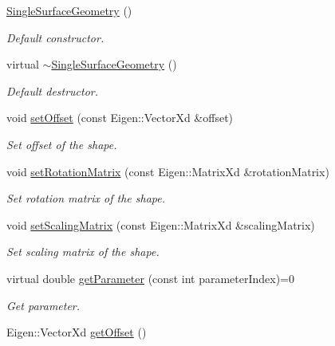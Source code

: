 \begin{DoxyCompactItemize}
\item 
\hyperlink{classtudat_1_1geometric__shapes_1_1SingleSurfaceGeometry_a84a7a555f2d51bbf05417aa696e18a20}{Single\+Surface\+Geometry} ()
\begin{DoxyCompactList}\small\item\em Default constructor. \end{DoxyCompactList}\item 
virtual \hyperlink{classtudat_1_1geometric__shapes_1_1SingleSurfaceGeometry_ac276f4deb7405652e3e0521218910996}{$\sim$\+Single\+Surface\+Geometry} ()
\begin{DoxyCompactList}\small\item\em Default destructor. \end{DoxyCompactList}\item 
void \hyperlink{classtudat_1_1geometric__shapes_1_1SingleSurfaceGeometry_a97575d937668eb0079cce753ce08fabf}{set\+Offset} (const Eigen\+::\+Vector\+Xd \&offset)
\begin{DoxyCompactList}\small\item\em Set offset of the shape. \end{DoxyCompactList}\item 
void \hyperlink{classtudat_1_1geometric__shapes_1_1SingleSurfaceGeometry_aa47f4c3453f2d5365f41c23c6c1cf2e5}{set\+Rotation\+Matrix} (const Eigen\+::\+Matrix\+Xd \&rotation\+Matrix)
\begin{DoxyCompactList}\small\item\em Set rotation matrix of the shape. \end{DoxyCompactList}\item 
void \hyperlink{classtudat_1_1geometric__shapes_1_1SingleSurfaceGeometry_a7c8b995d50fa752ec0447d2bd18cd6b7}{set\+Scaling\+Matrix} (const Eigen\+::\+Matrix\+Xd \&scaling\+Matrix)
\begin{DoxyCompactList}\small\item\em Set scaling matrix of the shape. \end{DoxyCompactList}\item 
virtual double \hyperlink{classtudat_1_1geometric__shapes_1_1SingleSurfaceGeometry_a17437a185d1bc67dd7dc3cdfb43d92a6}{get\+Parameter} (const int parameter\+Index)=0
\begin{DoxyCompactList}\small\item\em Get parameter. \end{DoxyCompactList}\item 
Eigen\+::\+Vector\+Xd \hyperlink{classtudat_1_1geometric__shapes_1_1SingleSurfaceGeometry_a64b41f34c562915f6b2842d460298d1d}{get\+Offset} ()

\end{DoxyCompactItemize}
